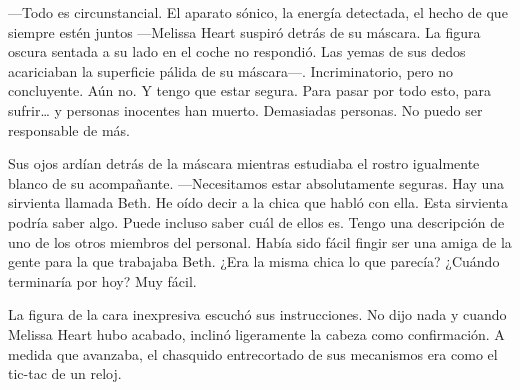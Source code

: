 {---Todo es circunstancial. El aparato sónico, la energía detectada, el
	hecho de que siempre estén juntos ---Melissa Heart suspiró detrás de su
	máscara. La figura oscura sentada a su lado en el coche no respondió.
	Las yemas de sus dedos acariciaban la superficie pálida de su
	máscara---. Incriminatorio, pero no concluyente. Aún no. Y tengo que
	estar segura. Para pasar por todo esto, para sufrir\ldots{} y personas
	inocentes han muerto. Demasiadas personas. No puedo ser responsable de
más.}

{Sus ojos ardían detrás de la máscara mientras estudiaba el rostro
	igualmente blanco de su acompañante. ---Necesitamos estar absolutamente
	seguras. Hay una sirvienta llamada Beth. He oído decir a la chica que
	habló con ella. Esta sirvienta podría saber algo. Puede incluso saber
	cuál de ellos es. Tengo una descripción de uno de los otros miembros del
	personal. Había sido fácil fingir ser una amiga de la gente para la que
	trabajaba Beth. ¿Era la misma chica lo que parecía? ¿Cuándo terminaría
por hoy? Muy fácil.}

{La figura de la cara inexpresiva escuchó sus instrucciones. No dijo
	nada y cuando Melissa Heart hubo acabado, inclinó ligeramente la cabeza
	como confirmación. A medida que avanzaba, el chasquido entrecortado de
sus mecanismos era como el tic-tac de un reloj.}
